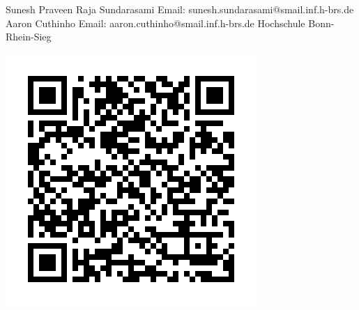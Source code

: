 

    {
        \begin{minipage}{0.75\linewidth}
            Sunesh Praveen Raja Sundarasami\newline
            Email: sunesh.sundarasami@smail.inf.h-brs.de\newline
            Aaron Cuthinho\newline
            Email: aaron.cuthinho@smail.inf.h-brs.de\newline
            Hochschule Bonn-Rhein-Sieg\newline


        \end{minipage}
        \begin{minipage}{0.24\linewidth}
            \vspace{-1.5cm}
            \begin{tikzfigure}
                \includegraphics[scale=0.5]{figures/sunesh-aaron_qrcode.png}
            \end{tikzfigure}
        \end{minipage}


}

